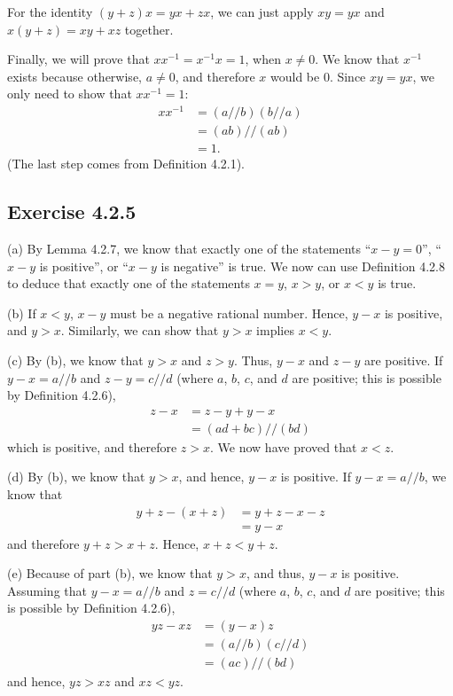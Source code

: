 \documentclass[12pt, oneside]{book}
\begin{document}
	For the identity $(y + z)x = yx + zx$, we can just apply $xy = yx$ and $x(y + z) = xy + xz$ together.
	
	Finally, we will prove that $xx^{-1} = x^{-1}x = 1$, when $x \ne 0$. We know that $x^{-1}$ exists because otherwise, $a \ne 0$, and therefore $x$ would be $0$. Since $xy = yx$, we only need to show that $xx^{-1} = 1$:
	\[\begin{split}
		xx^{-1} &= (a // b)(b // a) \\
		&= (ab) // (ab) \\
		&= 1.
	\end{split}\]
	(The last step comes from Definition 4.2.1).
	
	\subsection*{Exercise 4.2.5}
	
	\noindent (a) By Lemma 4.2.7, we know that exactly one of the statements ``$x - y = 0$'', ``$x - y$ is positive'', or ``$x - y$ is negative'' is true. We now can use Definition 4.2.8 to deduce that exactly one of the statements $x = y$, $x > y$, or $x < y$ is true.
	
	\bigskip
	\noindent (b) If $x < y$, $x - y$ must be a negative rational number. Hence, $y - x$ is positive, and $y > x$. Similarly, we can show that $y > x$ implies $x < y$.
	
	\bigskip
	\noindent (c) By (b), we know that $y > x$ and $z > y$. Thus, $y - x$ and $z - y$ are positive. If $y - x = a // b$ and $z - y = c // d$ (where $a$, $b$, $c$, and $d$ are positive; this is possible by Definition 4.2.6),
	\[\begin{split}
		z - x &= z - y + y - x \\
		&= (ad + bc) // (bd)
	\end{split}\]
	which is positive, and therefore $z > x$. We now have proved that $x < z$.
	
	\bigskip
	\noindent (d) By (b), we know that $y > x$, and hence, $y - x$ is positive. If $y - x = a // b$, we know that
	\[\begin{split}
		y + z - (x + z) &= y + z - x - z \\
		&= y - x
	\end{split}\]
	and therefore $y + z > x + z$. Hence, $x + z < y + z$.
	
	\bigskip
	\noindent (e) Because of part (b), we know that $y > x$, and thus, $y - x$ is positive. Assuming that $y - x = a // b$ and $z = c // d$ (where $a$, $b$, $c$, and $d$ are positive; this is possible by Definition 4.2.6),
	\[\begin{split}
		yz - xz &= (y - x)z \\
		&= (a // b)(c // d) \\
		&= (ac) // (bd)
	\end{split}\]
	and hence, $yz > xz$ and $xz < yz$.
	
\end{document}
